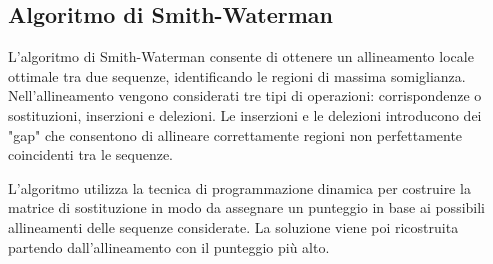 \documentclass[a4paper,12pt]{article}
\begin{document}
\subsection{Algoritmo di Smith-Waterman}
L'algoritmo di Smith-Waterman consente di ottenere un allineamento locale ottimale tra due sequenze, identificando le regioni di massima somiglianza.
Nell'allineamento vengono considerati tre tipi di operazioni: corrispondenze o sostituzioni, inserzioni e delezioni.
Le inserzioni e le delezioni introducono dei "gap" che consentono di allineare correttamente regioni non perfettamente coincidenti tra le sequenze.

L'algoritmo utilizza la tecnica di programmazione dinamica per costruire la matrice di sostituzione in modo da assegnare un punteggio in base ai possibili allineamenti delle sequenze considerate. La soluzione viene poi ricostruita partendo dall'allineamento con il punteggio più alto.
\end{document}

